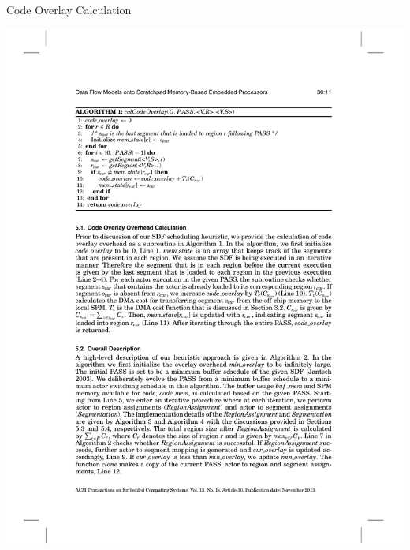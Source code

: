 \documentclass{beamer}
\begin{document}
\begin{frame}{Code Overlay Calculation}
  \begin{center}
    \hspace*{-0.1\textwidth}
    \includegraphics[width=1.2\textwidth]{algo1} %
  \end{center}
\end{frame}
\end{document}
